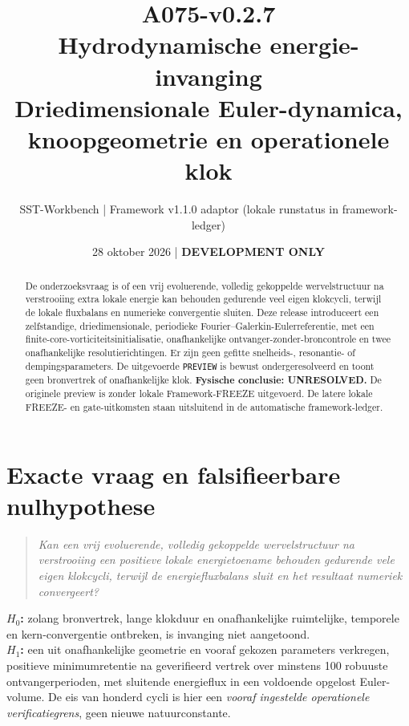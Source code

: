 \documentclass[10pt,a4paper]{article}
\title{\textcolor{main}{A075-v0.2.7}\\Hydrodynamische energie-invanging\\\large Driedimensionale Euler-dynamica, knoopgeometrie en operationele klok}
\author{SST-Workbench | Framework v1.1.0 adaptor (lokale runstatus in framework-ledger)}
\date{28 oktober 2026 | \textbf{DEVELOPMENT ONLY}}
\begin{document}
\maketitle
\begin{abstract}
De onderzoeksvraag is of een vrij evoluerende, volledig gekoppelde wervelstructuur na verstrooiing extra lokale energie kan behouden gedurende veel eigen klokcycli, terwijl de lokale fluxbalans en numerieke convergentie sluiten. Deze release introduceert een zelfstandige, driedimensionale, periodieke Fourier--Galerkin-Eulerreferentie, met een finite-core-vorticiteitsinitialisatie, onafhankelijke ontvanger-zonder-broncontrole en twee onafhankelijke resolutierichtingen. Er zijn geen gefitte snelheids-, resonantie- of dempingsparameters. De uitgevoerde \texttt{PREVIEW} is bewust ondergeresolveerd en toont geen bronvertrek of onafhankelijke klok. \textbf{Fysische conclusie: UNRESOLVED.} De originele preview is zonder lokale Framework-FREEZE uitgevoerd. De latere lokale FREEZE- en gate-uitkomsten staan uitsluitend in de automatische framework-ledger.
\end{abstract}
\section{Exacte vraag en falsifieerbare nulhypothese}
\begin{quote}\emph{Kan een vrij evoluerende, volledig gekoppelde wervelstructuur na verstrooiing een positieve lokale energietoename behouden gedurende vele eigen klokcycli, terwijl de energiefluxbalans sluit en het resultaat numeriek convergeert?}\end{quote}
\textbf{$H_0$:} zolang bronvertrek, lange klokduur en onafhankelijke ruimtelijke, temporele en kern-convergentie ontbreken, is invanging niet aangetoond.\\
\textbf{$H_1$:} een uit onafhankelijke geometrie en vooraf gekozen parameters verkregen, positieve minimumretentie na geverifieerd vertrek over minstens 100 robuuste ontvangerperioden, met sluitende energieflux in een voldoende opgelost Euler-volume.
De eis van honderd cycli is hier een \emph{vooraf ingestelde operationele verificatiegrens}, geen nieuwe natuurconstante.
\end{document}
